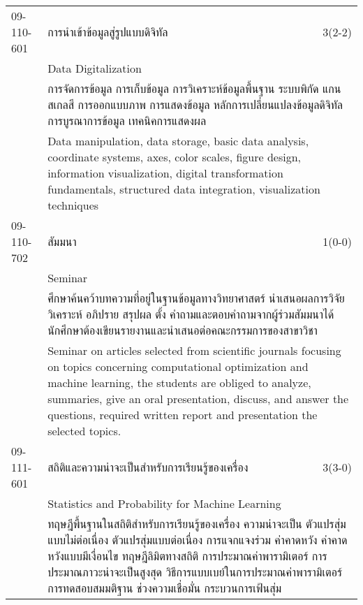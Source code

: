 \begin{longtable}{p{}p{}r{}}
09-110-601 & การนำเข้าข้อมูลสู่รูปแบบดิจิทัล & 3(2-2)\\*
 & Data Digitalization & \phantom{x} \vspace{3mm} \\*
&  \multicolumn{2}{p{0.75\textwidth}}{การจัดการข้อมูล  การเก็บข้อมูล  การวิเคราะห์ข้อมูลพื้นฐาน  ระบบพิกัด  แกน  สเกลสี  การออกแบบภาพ  การแสดงข้อมูล  หลักการเปลี่ยนแปลงข้อมูลดิจิทัล  การบูรณาการข้อมูล  เทคนิคการแสดงผล} \vspace{3mm} \\*
&  \multicolumn{2}{p{0.75\textwidth}}{Data manipulation, data storage, basic data analysis, coordinate systems, axes, color scales, figure design, information visualization, digital transformation fundamentals, structured data integration, visualization techniques} \vspace{8mm} \\*
09-110-702 & สัมมนา & 1(0-0)\\*
 & Seminar & \phantom{x} \vspace{3mm} \\*
&  \multicolumn{2}{p{0.75\textwidth}}{ศึกษาค้นคว้าบทความที่อยู่ในฐานข้อมูลทางวิทยาศาสตร์ นำเสนอผลการวิจัย วิเคราะห์ อภิปราย สรุปผล ตั้ง คำถามและตอบคำถามจากผู้ร่วมสัมมนาได้ นักศึกษาต้องเขียนรายงานและนำเสนอต่อคณะกรรมการของสาขาวิชา} \vspace{3mm} \\*
&  \multicolumn{2}{p{0.75\textwidth}}{Seminar on articles selected from scientific journals focusing on topics concerning computational optimization and machine learning, the students are obliged to analyze, summaries, give an oral presentation, discuss, and answer the questions, required written report and presentation the selected topics.} \vspace{8mm} \\*
09-111-601 & สถิติและความน่าจะเป็นสำหรับการเรียนรู้ของเครื่อง & 3(3-0)\\*
 & Statistics and Probability for Machine Learning & \phantom{x} \vspace{3mm} \\*
&  \multicolumn{2}{p{0.75\textwidth}}{ทฤษฎีพื้นฐานในสถิติสำหรับการเรียนรู้ของเครื่อง ความน่าจะเป็น ตัวแปรสุ่มแบบไม่ต่อเนื่อง ตัวแปรสุ่มแบบต่อเนื่อง การแจกแจงร่วม ค่าคาดหวัง ค่าคาดหวังแบบมีเงื่อนไข ทฤษฎีลิมิตทางสถิติ การประมาณค่าพารามิเตอร์ การประมาณภาวะน่าจะเป็นสูงสุด วิธีการแบบเบย์ในการประมาณค่าพารามิเตอร์ การทดสอบสมมติฐาน ช่วงความเชื่อมั่น กระบวนการเฟ้นสุ่ม} \vspace{3mm} \\*

\end{longtable}
